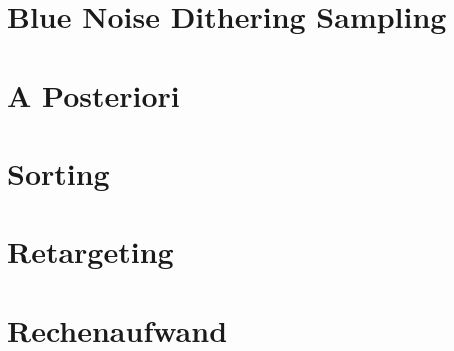 \section{Blue Noise Dithering Sampling}
\label{ch:Content1:sec:blue noise sampling}


\section{A Posteriori}
\label{ch:Content2:sec:a Posteriori}




\section{Sorting}
\label{ch:Content2:sec:Sorting}




\section{Retargeting}
\label{ch:Content2:sec:Retargeting}



\section{Rechenaufwand}
\label{ch:Content2:sec:Rechenaufwand}




